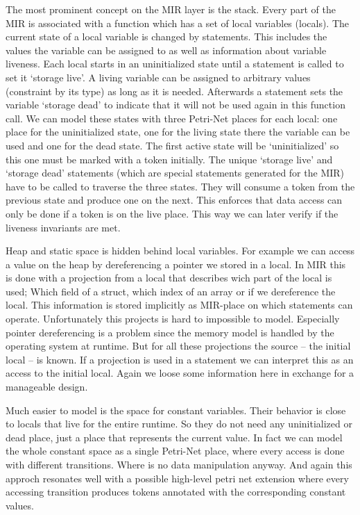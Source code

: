 The most prominent concept on the MIR layer is the stack.
Every part of the MIR is associated with a function which has a set of local variables (locals).
The current state of a local variable is changed by statements.
This includes the values the variable can be assigned to as well as information about variable liveness.
Each local starts in an uninitialized state until a statement is called to set it `storage live'.
A living variable can be assigned to arbitrary values (constraint by its type) as long as it is needed.
Afterwards a statement sets the variable `storage dead' to indicate that it will not be used again in this function call.
We can model these states with three Petri-Net places for each local: one place for the uninitialized state, one for the living state there the variable can be used and one for the dead state.
The first active state will be `uninitialized' so this one must be marked with a token initially.
The unique `storage live' and `storage dead' statements (which are special statements generated for the MIR) have to be called to traverse the three states.
They will consume a token from the previous state and produce one on the next.
This enforces that data access can only be done if a token is on the live place.
This way we can later verify if the liveness invariants are met.

Heap and static space is hidden behind local variables.
For example we can access a value on the heap by dereferencing a pointer we stored in a local.
In MIR this is done with a projection from a local that describes wich part of the local is used;
Which field of a struct, which index of an array or if we dereference the local.
This information is stored implicitly as MIR-place on which statements can operate.
Unfortunately this projects is hard to impossible to model.
Especially pointer dereferencing is a problem since the memory model is handled by the operating system at runtime.
But for all these projections the source -- the initial local -- is known.
If a projection is used in a statement we can interpret this as an access to the initial local.
Again we loose some information here in exchange for a manageable design.

Much easier to model is the space for constant variables.
Their behavior is close to locals that live for the entire runtime.
So they do not need any uninitialized or dead place, just a place that represents the current value.
In fact we can model the whole constant space as a single Petri-Net place, where every access is done with different transitions.
Where is no data manipulation anyway.
And again this approch resonates well with a possible high-level petri net extension where every accessing transition produces tokens annotated with the corresponding constant values.

